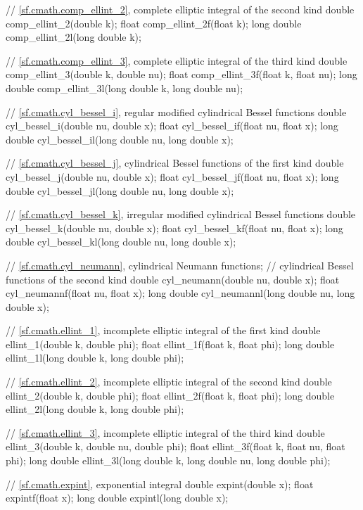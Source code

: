 \begin{codeblock}
{  // \ref{sf.cmath.comp_ellint_2}, complete elliptic integral of the second kind
  double       comp_ellint_2(double k);
  float        comp_ellint_2f(float k);
  long double  comp_ellint_2l(long double k);

  // \ref{sf.cmath.comp_ellint_3}, complete elliptic integral of the third kind
  double       comp_ellint_3(double k, double nu);
  float        comp_ellint_3f(float k, float nu);
  long double  comp_ellint_3l(long double k, long double nu);

  // \ref{sf.cmath.cyl_bessel_i}, regular modified cylindrical Bessel functions
  double       cyl_bessel_i(double nu, double x);
  float        cyl_bessel_if(float nu, float x);
  long double  cyl_bessel_il(long double nu, long double x);

  // \ref{sf.cmath.cyl_bessel_j}, cylindrical Bessel functions of the first kind
  double       cyl_bessel_j(double nu, double x);
  float        cyl_bessel_jf(float nu, float x);
  long double  cyl_bessel_jl(long double nu, long double x);

  // \ref{sf.cmath.cyl_bessel_k}, irregular modified cylindrical Bessel functions
  double       cyl_bessel_k(double nu, double x);
  float        cyl_bessel_kf(float nu, float x);
  long double  cyl_bessel_kl(long double nu, long double x);

  // \ref{sf.cmath.cyl_neumann}, cylindrical Neumann functions;
  // cylindrical Bessel functions of the second kind
  double       cyl_neumann(double nu, double x);
  float        cyl_neumannf(float nu, float x);
  long double  cyl_neumannl(long double nu, long double x);

  // \ref{sf.cmath.ellint_1}, incomplete elliptic integral of the first kind
  double       ellint_1(double k, double phi);
  float        ellint_1f(float k, float phi);
  long double  ellint_1l(long double k, long double phi);

  // \ref{sf.cmath.ellint_2}, incomplete elliptic integral of the second kind
  double       ellint_2(double k, double phi);
  float        ellint_2f(float k, float phi);
  long double  ellint_2l(long double k, long double phi);

  // \ref{sf.cmath.ellint_3}, incomplete elliptic integral of the third kind
  double       ellint_3(double k, double nu, double phi);
  float        ellint_3f(float k, float nu, float phi);
  long double  ellint_3l(long double k, long double nu, long double phi);

  // \ref{sf.cmath.expint}, exponential integral
  double       expint(double x);
  float        expintf(float x);
  long double  expintl(long double x);

}
\end{codeblock}
